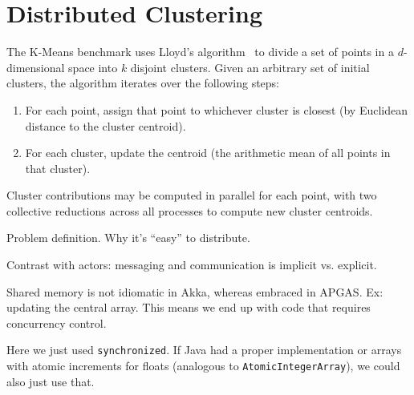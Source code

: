 \section{Distributed \kmeans Clustering}
\label{sec:kmeans}

The K-Means benchmark uses Lloyd's algorithm~\cite{Lloyd1982Least} to divide a set of points in a $d$-dimensional space into $k$ disjoint clusters.
Given an arbitrary set of initial clusters, the algorithm iterates over the following steps:
\begin{enumerate}
  \item For each point, assign that point to whichever cluster is closest (by Euclidean distance to the cluster centroid).
  \item For each cluster, update the centroid (the arithmetic mean of all points in that cluster).
\end{enumerate}

Cluster contributions may be computed in parallel for each point, with two collective reductions across all processes to compute new cluster centroids.

Problem definition. Why it's ``easy'' to distribute.

Contrast with actors: messaging and communication is implicit vs. explicit.

Shared memory is not idiomatic in Akka, whereas embraced in APGAS. Ex: updating
the central array. This means we end up with code that requires concurrency
control.

Here we just used \lstinline{synchronized}. If Java had a proper
implementation or arrays with atomic increments for floats (analogous to
\lstinline{AtomicIntegerArray}), we could also just use that.
